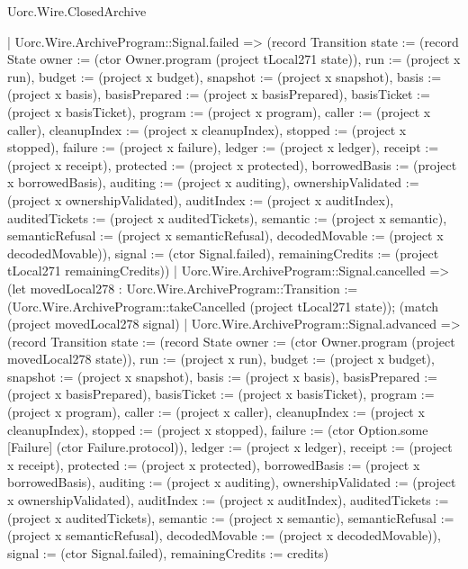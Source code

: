 \begin{lexlean}{Uorc.Wire.ClosedArchive}
\begin{semanticmodule}
{      | Uorc.Wire.ArchiveProgram::Signal.failed => (record Transition {state := (record State {owner := (ctor Owner.program (project tLocal271 state)), run := (project x run), budget := (project x budget), snapshot := (project x snapshot), basis := (project x basis), basisPrepared := (project x basisPrepared), basisTicket := (project x basisTicket), program := (project x program), caller := (project x caller), cleanupIndex := (project x cleanupIndex), stopped := (project x stopped), failure := (project x failure), ledger := (project x ledger), receipt := (project x receipt), protected := (project x protected), borrowedBasis := (project x borrowedBasis), auditing := (project x auditing), ownershipValidated := (project x ownershipValidated), auditIndex := (project x auditIndex), auditedTickets := (project x auditedTickets), semantic := (project x semantic), semanticRefusal := (project x semanticRefusal), decodedMovable := (project x decodedMovable)}), signal := (ctor Signal.failed), remainingCredits := (project tLocal271 remainingCredits)})
      | Uorc.Wire.ArchiveProgram::Signal.cancelled => (let movedLocal278 : Uorc.Wire.ArchiveProgram::Transition := (Uorc.Wire.ArchiveProgram::takeCancelled (project tLocal271 state)); (match (project movedLocal278 signal)
        | Uorc.Wire.ArchiveProgram::Signal.advanced => (record Transition {state := (record State {owner := (ctor Owner.program (project movedLocal278 state)), run := (project x run), budget := (project x budget), snapshot := (project x snapshot), basis := (project x basis), basisPrepared := (project x basisPrepared), basisTicket := (project x basisTicket), program := (project x program), caller := (project x caller), cleanupIndex := (project x cleanupIndex), stopped := (project x stopped), failure := (ctor Option.some [Failure] (ctor Failure.protocol)), ledger := (project x ledger), receipt := (project x receipt), protected := (project x protected), borrowedBasis := (project x borrowedBasis), auditing := (project x auditing), ownershipValidated := (project x ownershipValidated), auditIndex := (project x auditIndex), auditedTickets := (project x auditedTickets), semantic := (project x semantic), semanticRefusal := (project x semanticRefusal), decodedMovable := (project x decodedMovable)}), signal := (ctor Signal.failed), remainingCredits := credits})
}
\end{semanticmodule}
\end{lexlean}
